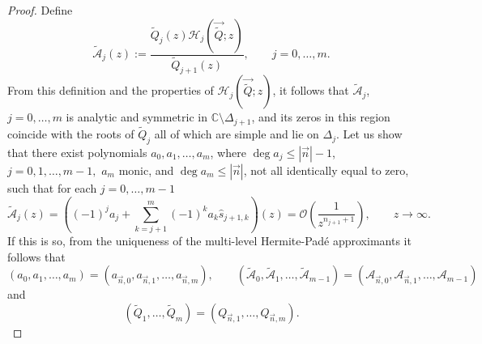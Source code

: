 \documentclass{amsart}
\numberwithin{equation}{section}
\theoremstyle{definition}
\newcommand{\CC}{\mathbb{C}}      %
\newcommand{\n}{\vec{n}}          %
\begin{document}
\begin{proof}
    Define
    \begin{equation}
        \label{Aj}
        \tilde{\mathcal{A}}_{j}(z) :=  \frac{ \tilde{Q}_{j}(z)\mathcal{H}_{j}( \vec{\tilde{Q}};z)}{\tilde{Q}_{j+1}(z)}, \qquad j=0,\ldots,m.
    \end{equation}
    From this definition and the properties of $\mathcal{H}_{j}( \vec{\tilde{Q}};z)$, it follows that $\tilde{\mathcal{A}}_{j}$, $j=0,\ldots,m$ is analytic and symmetric in $\CC \setminus \Delta_{j+1}$, and its zeros in this region coincide with the roots of $\tilde{Q}_{j}$ all of which are simple and lie on $\Delta_j$. Let us show that there exist polynomials $a_{0}, a_{1},\ldots,a_{m}$, where $\deg a_{j}\leq |\n|-1$, $j=0,1,\ldots,m-1,$ $a_{m}$ monic, and $\deg a_{m}\leq |\n|$, not all identically equal to zero, such that for each $j=0,\ldots,m-1$
    \begin{equation*}
        \tilde{\mathcal{A}}_{j}(z) = \left((-1)^j a_{j} + \sum_{k=j+1}^m (-1)^k a_{k}\widehat{s}_{j+1,k}\right)(z) = \mathcal{O}\left(\frac{1}{z^{n_{j+1}+1}}\right), \qquad z \to \infty.
    \end{equation*}
    If this is so, from the uniqueness of the multi-level Hermite-Pad\'e approximants it follows that
    \[
      (a_{0}, a_{1},\ldots,a_{m}) = (a_{\n,0}, a_{\n,1},\ldots,a_{\n,m}),\qquad (\tilde{\mathcal{A}}_{0}, \tilde{\mathcal{A}}_{1},\ldots,\tilde{\mathcal{A}}_{m-1}) = ( {\mathcal{A}}_{\n,0}, {\mathcal{A}}_{\n,1},\ldots, {\mathcal{A}}_{m-1})
    \]
    and
    \[ (\tilde{Q}_{1},\ldots,\tilde{Q}_{m}) = (Q_{\n,1},\ldots,Q_{\n,m}).
    \]


\end{proof}
\end{document}
